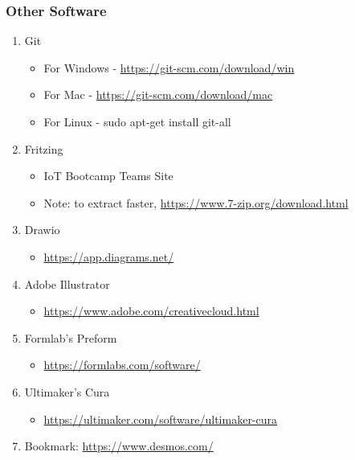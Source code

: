 \documentclass{beamer}
\begin{document}
\begin{frame}\frametitle{Other Software}
\begin{enumerate}
\item Git
	\begin{itemize}
	\item For Windows - \url{https://git-scm.com/download/win}
	\item For Mac - \url{https://git-scm.com/download/mac}
	\item For Linux - sudo apt-get install git-all
	\end{itemize}
\item Fritzing
	\begin{itemize}
	\item IoT Bootcamp Teams Site
	\item Note: to extract faster, \url{https://www.7-zip.org/download.html}
	\end{itemize}
\item Drawio
	\begin{itemize}
	\item \url{https://app.diagrams.net/}
	\end{itemize}
\item Adobe Illustrator 
	\begin{itemize}
	\item \url{https://www.adobe.com/creativecloud.html} 
	\end{itemize}
\item Formlab's Preform
	\begin{itemize}
	\item \url{https://formlabs.com/software/}
	\end{itemize}
\item Ultimaker's Cura
	\begin{itemize}
	\item \url{https://ultimaker.com/software/ultimaker-cura}
	\end{itemize}
\item Bookmark: \url{https://www.desmos.com/}
\end{enumerate}
\end{frame}
\end{document}
